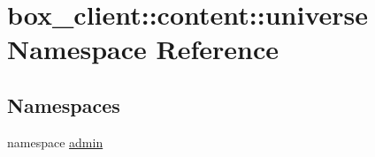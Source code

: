 \hypertarget{namespacebox__client_1_1content_1_1universe}{
\section{box\_\-client::content::universe Namespace Reference}
\label{namespacebox__client_1_1content_1_1universe}
}
\subsection*{Namespaces}
\begin{DoxyCompactItemize}
\item 
namespace \hyperlink{namespacebox__client_1_1content_1_1universe_1_1admin}{admin}
\end{DoxyCompactItemize}
